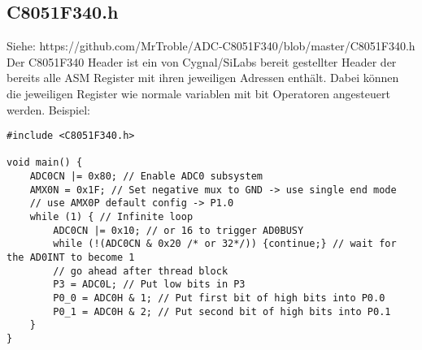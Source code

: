 \documentclass{article}
\begin{document}
\subsection{C8051F340.h}
Siehe: https://github.com/MrTroble/ADC-C8051F340/blob/master/C8051F340.h
\newline\newline
Der C8051F340 Header ist ein von Cygnal/SiLabs bereit gestellter Header der bereits alle ASM Register mit ihren jeweiligen Adressen enthält. Dabei können die jeweiligen Register wie normale variablen mit bit Operatoren angesteuert werden. Beispiel:
\begin{verbatim}
#include <C8051F340.h>

void main() {
    ADC0CN |= 0x80; // Enable ADC0 subsystem
    AMX0N = 0x1F; // Set negative mux to GND -> use single end mode
    // use AMX0P default config -> P1.0
    while (1) { // Infinite loop
        ADC0CN |= 0x10; // or 16 to trigger AD0BUSY
        while (!(ADC0CN & 0x20 /* or 32*/)) {continue;} // wait for the AD0INT to become 1
        // go ahead after thread block
        P3 = ADC0L; // Put low bits in P3
        P0_0 = ADC0H & 1; // Put first bit of high bits into P0.0
        P0_1 = ADC0H & 2; // Put second bit of high bits into P0.1
    }
}
\end{verbatim}
\end{document}
